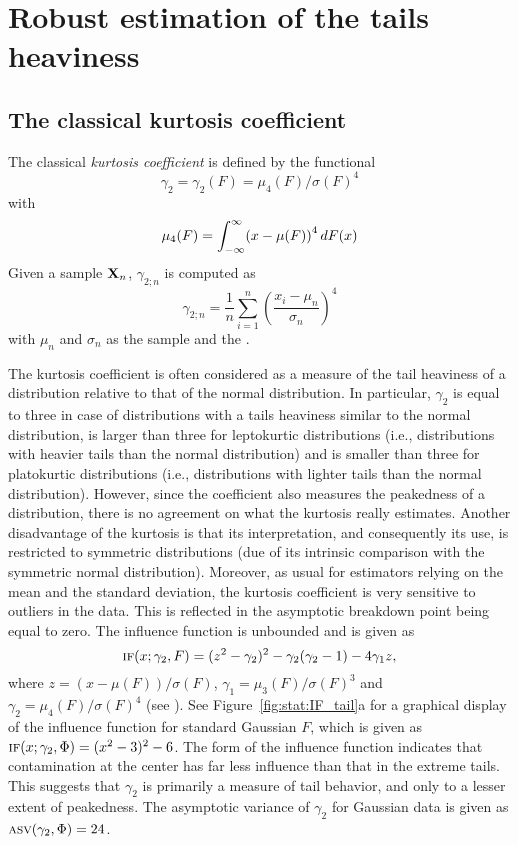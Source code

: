 
\section{Robust estimation of the tails heaviness}
\label{subsec:kurtosis}

\subsection{The classical kurtosis coefficient}

The classical \emph{kurtosis coefficient} is defined by the functional
\[
    \gamma_2 = \gamma_2(F) = \mu_{4}(F)/\sigma(F)^{4}
\]
with
\[
    \mu_{4}(F) = \int_{-\infty}^\infty \left(x-\mu(F)\right)^{4} \dif F(x)
\]
Given a sample $\mathbf X_n$, $\gamma_{2;n}$ is computed as
\[
    \gamma_{2;n} = \frac{1}{n} \sum_{i=1}^n \left(\frac{x_i-\mu_n}{\sigma_n}\right)^{4}
\]
with $\mu_n$ and $\sigma_n$ as the sample  and the . 

The kurtosis coefficient is often considered as a measure of the
tail heaviness of a distribution relative to that of the normal distribution.
In particular, $\gamma_2$ is equal to three in case of distributions with a
tails heaviness similar to the normal distribution, is larger than three for
leptokurtic distributions (i.e., distributions with heavier tails than the
normal distribution) and is smaller than three for platokurtic distributions
(i.e., distributions with lighter tails than the normal distribution).
However, since the coefficient also measures the peakedness of a
distribution, there is no agreement on what the kurtosis really estimates. Another
disadvantage of the kurtosis is that its interpretation, and consequently its
use, is restricted to symmetric distributions (due of its intrinsic
comparison with the symmetric normal distribution). Moreover, as usual for
estimators relying on the mean and the standard deviation, the kurtosis
coefficient is very sensitive to outliers in the data. This is reflected in
the asymptotic breakdown point being equal to zero. The influence function is unbounded 
and is given as
\[
    \stsc{IF}(x; \gamma_2,F) = (z^2-\gamma_2)^2 - \gamma_2(\gamma_2-1) - 4\gamma_1 z,
\]
where $z = \left(x-\mu(F)\right)/\sigma(F)$, $\gamma_1 = \mu_{3}(F)/\sigma(F)^{3}$ and
$\gamma_2 = \mu_{4}(F)/\sigma(F)^{4}$ (see \citealp{ruppert:1987}).
See Figure~\ref{fig:stat:IF_tail}a for a graphical display of the influence function for 
standard Gaussian $F$, which is given as $\stsc{IF}(x; \gamma_2, \Phi) = (x^2-3)^2-6$.
The form of the influence function indicates that contamination
at the center has far less influence than that in the extreme tails. This
suggests that $\gamma_2$ is primarily a measure of tail behavior, and only
to a lesser extent of peakedness. The asymptotic variance of $\gamma_2$ for Gaussian 
data is given as $\stsc{ASV}(\gamma_2, \Phi) = 24$.                           



